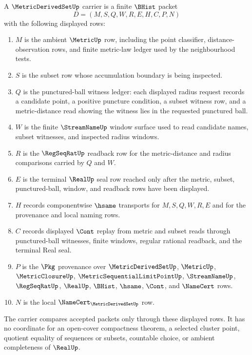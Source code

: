 \begin{definition}
\label{def:metric-derived-set-carrier}
A $\MetricDerivedSetUp$ carrier is a finite $\BHist$ packet
$$
D=(M,S,Q,W,R,E,H,C,P,N)
$$
with the following displayed rows:
\begin{enumerate}
\item $M$ is the ambient $\MetricUp$ row, including the point classifier, distance-observation rows, and finite metric-law ledger used by the neighbourhood tests.
\item $S$ is the subset row whose accumulation boundary is being inspected.
\item $Q$ is the punctured-ball witness ledger: each displayed radius request records a candidate point, a positive puncture condition, a subset witness row, and a metric-distance read showing the witness lies in the requested punctured ball.
\item $W$ is the finite $\StreamNameUp$ window surface used to read candidate names, subset witnesses, and inspected radius windows.
\item $R$ is the $\RegSeqRatUp$ readback row for the metric-distance and radius comparisons carried by $Q$ and $W$.
\item $E$ is the terminal $\RealUp$ seal row reached only after the metric, subset, punctured-ball, window, and readback rows have been displayed.
\item $H$ records componentwise $\hsame$ transports for $M,S,Q,W,R,E$ and for the provenance and local naming rows.
\item $C$ records displayed $\Cont$ replay from metric and subset reads through punctured-ball witnesses, finite windows, regular rational readback, and the terminal Real seal.
\item $P$ is the $\Pkg$ provenance over $\MetricDerivedSetUp$, $\MetricUp$, $\MetricClosureUp$, $\MetricSequentialLimitPointUp$, $\StreamNameUp$, $\RegSeqRatUp$, $\RealUp$, $\BHist$, $\hsame$, $\Cont$, and $\NameCert$ rows.
\item $N$ is the local $\NameCert_{\MetricDerivedSetUp}$ row.
\end{enumerate}
The carrier compares accepted packets only through these displayed rows. It has no coordinate for an open-cover compactness theorem, a selected cluster point, quotient equality of sequences or subsets, countable choice, or ambient completeness of $\RealUp$.
\end{definition}

